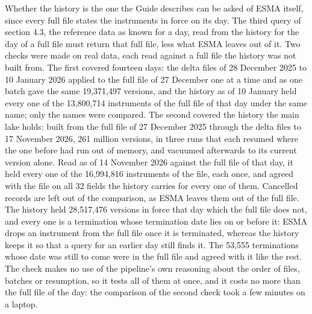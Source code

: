 Whether the history is the one the Guide describes can be asked of ESMA itself, since every full file states the instruments in force on its day. The third query of section 4.3, the reference data as known for a day, read from the history for the day of a full file must return that full file, less what ESMA leaves out of it. Two checks were made on real data, each read against a full file the history was not built from. The first covered fourteen days: the delta files of 28 December 2025 to 10 January 2026 applied to the full file of 27 December one at a time and as one batch gave the same 19,371,497 versions, and the history as of 10 January held every one of the 13,800,714 instruments of the full file of that day under the same name; only the names were compared. The second covered the history the main lake holds: built from the full file of 27 December 2025 through the delta files to 17 November 2026, 261 million versions, in three runs that each resumed where the one before had run out of memory, and vacuumed afterwards to its current version alone. Read as of 14 November 2026 against the full file of that day, it held every one of the 16,994,816 instruments of the file, each once, and agreed with the file on all 32 fields the history carries for every one of them. Cancelled records are left out of the comparison, as ESMA leaves them out of the full file. The history held 28,517,476 versions in force that day which the full file does not, and every one is a termination whose termination date lies on or before it: ESMA drops an instrument from the full file once it is terminated, whereas the history keeps it so that a query for an earlier day still finds it. The 53,555 terminations whose date was still to come were in the full file and agreed with it like the rest. The check makes no use of the pipeline's own reasoning about the order of files, batches or resumption, so it tests all of them at once, and it costs no more than the full file of the day: the comparison of the second check took a few minutes on a laptop.

